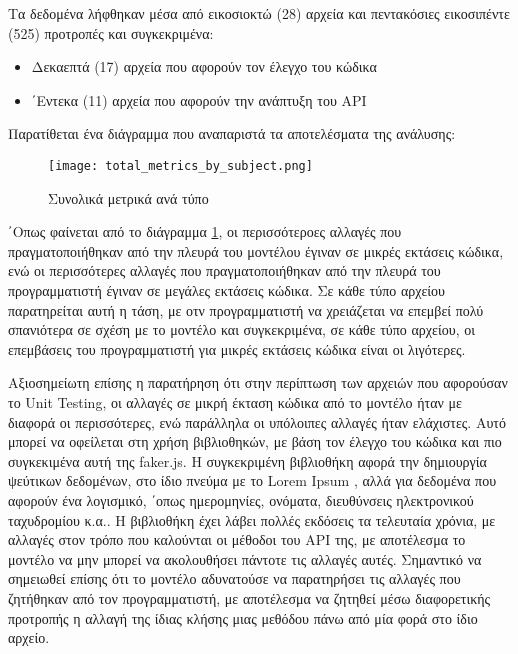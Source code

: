   Τα δεδομένα λήφθηκαν μέσα από εικοσιοκτώ (28) αρχεία και πεντακόσιες
  εικοσιπέντε (525) προτροπές και συγκεκριμένα:
  \begin{itemize}
    \item
      Δεκαεπτά (17) αρχεία που αφορούν τον έλεγχο του κώδικα
    \item
      ΄Εντεκα (11) αρχεία που αφορούν την ανάπτυξη του \textlatin{API}
  \end{itemize}

  Παρατίθεται ένα διάγραμμα που αναπαριστά τα αποτελέσματα της ανάλυσης:

  \begin{figure}[htbp]
    \centering
    \texttt{[image: total\_metrics\_by\_subject.png]}
    \caption{Συνολικά μετρικά ανά τύπο}
    \label{fig:totalMetrics}
  \end{figure}

  ΄Οπως φαίνεται από το διάγραμμα \ref{fig:totalMetrics}, οι περισσότεροες
  αλλαγές που πραγματοποιήθηκαν από την πλευρά του μοντέλου έγιναν σε
  μικρές εκτάσεις κώδικα, ενώ οι περισσότερες αλλαγές που
  πραγματοποιήθηκαν από την πλευρά του προγραμματιστή έγιναν σε μεγάλες
  εκτάσεις κώδικα. Σε κάθε τύπο αρχείου παρατηρείται αυτή η τάση, με οτν
  προγραμματιστή να χρειάζεται να επεμβεί πολύ σπανιότερα σε σχέση με το
  μοντέλο και συγκεκριμένα, σε κάθε τύπο αρχείου, οι επεμβάσεις του
  προγραμματιστή για μικρές εκτάσεις κώδικα είναι οι λιγότερες.

  Αξιοσημείωτη επίσης η παρατήρηση ότι στην περίπτωση των αρχειών που
  αφορούσαν το \textlatin{Unit Testing}, οι αλλαγές σε μικρή έκταση κώδικα
  από το μοντέλο ήταν με διαφορά οι περισσότερες, ενώ παράλληλα οι
  υπόλοιπες αλλαγές ήταν ελάχιστες. Αυτό μπορεί να οφείλεται στη χρήση
  βιβλιοθηκών, με βάση τον έλεγχο του κώδικα και πιο συγκεκιμένα αυτή της
  \textlatin{faker.js}\cite{fakerjs}. Η συγκεκριμένη βιβλιοθήκη αφορά την
  δημιουργία ψεύτικων δεδομένων, στο ίδιο πνεύμα με το \textlatin{Lorem
  Ipsum} \cite{lipsum}, αλλά για δεδομένα που αφορούν ένα λογισμικό,
  ΄οπως ημερομηνίες, ονόματα, διευθύνσεις ηλεκτρονικού ταχυδρομίου κ.α.. Η
  βιβλιοθήκη έχει λάβει πολλές εκδόσεις τα τελευταία χρόνια, με αλλαγές
  στον τρόπο που καλούνται οι μέθοδοι του \textlatin{API} της, με
  αποτέλεσμα το μοντέλο να μην μπορεί να ακολουθήσει πάντοτε τις αλλαγές
  αυτές. Σημαντικό να σημειωθεί επίσης ότι το μοντέλο αδυνατούσε να
  παρατηρήσει τις αλλαγές που ζητήθηκαν από τον προγραμματιστή, με
  αποτέλεσμα να ζητηθεί μέσω διαφορετικής προτροπής η αλλαγή της ίδιας
  κλήσης μιας μεθόδου πάνω από μία φορά στο ίδιο αρχείο.

